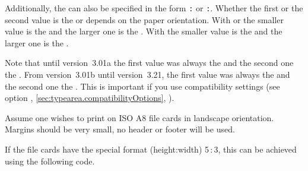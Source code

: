 Additionally, the  can
also be specified in the form \texttt{:} or
\texttt{:}.
Whether the first or the second value is
the  or  depends on the paper orientation. With
 or  the smaller
value is the  and the larger one is the . With
 the smaller value is the  and the
larger one is the .

Note that until version~3.01a the first value was always
the  and the second one the . From version~3.01b
until version~3.21, the first value was always the  and the
second one the . This is important if you use compatibility
settings (see option
,
\autoref{sec:typearea.compatibilityOptions},
).

\begin{Example}
 Assume one wishes to print on ISO A8 file cards in landscape
 orientation. Margins should be very small, no header or footer
 will be used.
If the file cards have the special format (height:width)
5\,:\,3, this can be achieved using the following
code.
\end{Example}


